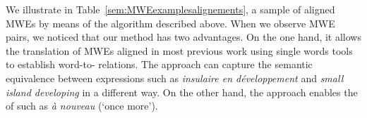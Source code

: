 \documentclass[output=paper,modfonts,nonflat]{langsci/langscibook}
\begin{document}
We illustrate in Table~\ref{sem:MWEexamplesalignements}, a sample of aligned MWEs by means of the algorithm described above.  When we observe MWE pairs, we noticed that our method has two advantages. On the one hand, it allows the translation of MWEs aligned in most previous work \citep{dagan1994termight,ren2009improving} using single words  tools to establish word-to- relations. 
The approach can capture the semantic equivalence between expressions such as \textit{insulaire en développement} and \textit{small island developing} in a different way.
 On the other hand, the approach enables the  of  such as \textit{à nouveau} (`once more'). 

\end{document}
